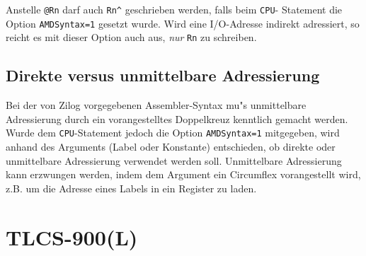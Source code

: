 \documentclass[12pt,a4paper,twoside]{report}
\newcommand{\tty}[1]{{\tt #1}}
\begin{document}
Anstelle \verb!@Rn! darf auch \verb!Rn^! geschrieben werden, falls beim \tty{CPU}-
Statement die Option \tty{AMDSyntax=1} gesetzt wurde.  Wird eine I/O-Adresse
indirekt adressiert, so reicht es mit dieser Option auch aus, {\em nur} \verb!Rn!
zu schreiben.

\subsection{Direkte versus unmittelbare Adressierung}

Bei der von Zilog vorgegebenen Assembler-Syntax mu"s unmittelbare Adressierung
durch ein vorangestelltes Doppelkreuz kenntlich gemacht werden.  Wurde dem
\tty{CPU}-Statement jedoch die Option \tty{AMDSyntax=1} mitgegeben, wird anhand
des Arguments (Label oder Konstante) entschieden, ob direkte oder unmittelbare
Adressierung verwendet werden soll.  Unmittelbare Adressierung kann erzwungen
werden, indem dem Argument ein Circumflex vorangestellt wird, z.B. um die
Adresse eines Labels in ein Register zu laden.


\section{TLCS-900(L)}
\label{TLCS900Spec}
\end{document}
